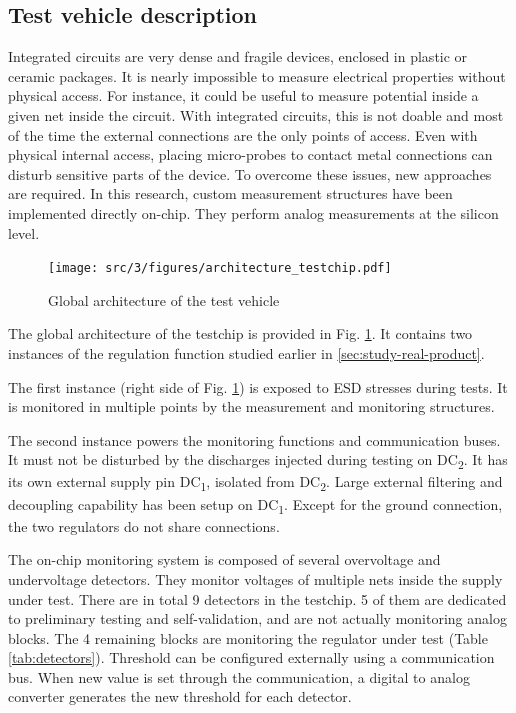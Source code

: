 \subsection{Test vehicle description}
\label{sec:test-vehicle-desc}

Integrated circuits are very dense and fragile devices, enclosed in plastic or ceramic packages.
It is nearly impossible to measure electrical properties without physical access.
For instance, it could be useful to measure potential inside a given net inside the circuit.
With integrated circuits, this is not doable and most of the time the external connections are the only points of access.
Even with physical internal access, placing micro-probes to contact metal connections can disturb sensitive parts of the device.
To overcome these issues, new approaches are required.
In this research, custom measurement structures have been implemented directly on-chip.
They perform analog measurements at the silicon level.

\begin{figure}[h]
  \centering
  \texttt{[image: src/3/figures/architecture\_testchip.pdf]}
  \caption{Global architecture of the test vehicle}
  \label{architecture_testchip}
\end{figure}

The global architecture of the testchip is provided in Fig. \ref{architecture_testchip}.
It contains two instances of the regulation function studied earlier in \ref{sec:study-real-product}.

The first instance (right side of Fig. \ref{architecture_testchip}) is exposed to \gls{ESD} stresses during tests.
It is monitored in multiple points by the measurement and monitoring structures.

The second instance powers the monitoring functions and communication buses.
It must not be disturbed by the discharges injected during testing on DC\textsubscript{2}.
It has its own external supply pin DC\textsubscript{1}, isolated from DC\textsubscript{2}.
Large external filtering and decoupling capability has been setup on DC\textsubscript{1}.
Except for the ground connection, the two regulators do not share connections.

The on-chip monitoring system is composed of several overvoltage and undervoltage detectors.
They monitor voltages of multiple nets inside the supply under test.
There are in total 9 detectors in the testchip.
5 of them are dedicated to preliminary testing and self-validation, and are not actually monitoring analog blocks.
The 4 remaining blocks are monitoring the regulator under test (Table \ref{tab:detectors}).
Threshold can be configured externally using a communication bus.
When new value is set through the communication, a digital to analog converter generates the new threshold for each detector.

